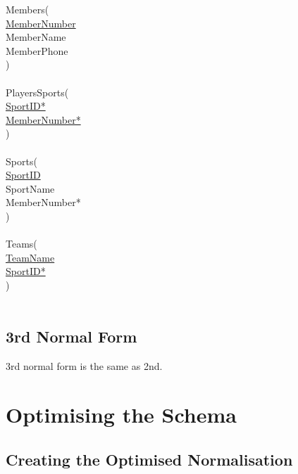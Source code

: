 \documentclass[11pt, article]{article}
\begin{document}
\begin{tabbing}
Members( \\
	\hspace{5mm}  \underline{MemberNumber}\\
	\hspace{5mm} MemberName                 \\
	\hspace{5mm} MemberPhone                \\
)\\
\\

PlayersSports(\\
	\hspace{5mm}  \underline{SportID*}\\
	\hspace{5mm}  \underline{MemberNumber*}\\
)\\
\\
Sports(\\
	\hspace{5mm}  \underline{SportID}\\
	\hspace{5mm} SportName\\
	\hspace{5mm}  MemberNumber*\\
)\\
\\
	
Teams( \newline \\
	\hspace{5mm}  \underline{TeamName}\\
	\hspace{5mm} \underline{SportID*}\\
)\\
\\
\end{tabbing}

\subsection{3rd Normal Form}

3rd normal form is the same as 2nd. 

		\section{Optimising the Schema}

\subsection{Creating the Optimised Normalisation}
\end{document}
